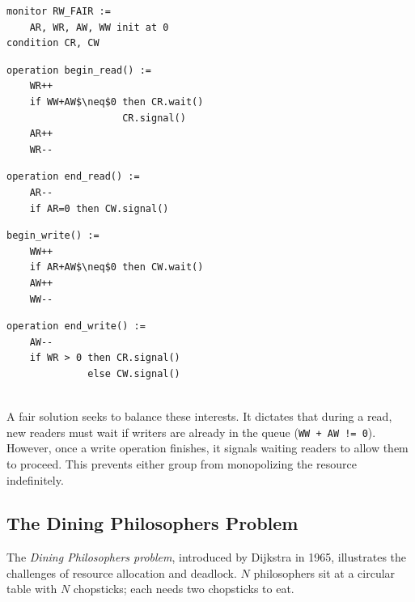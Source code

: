 \begin{minipage}{\textwidth}
\begin{lstlisting}[mathescape]
monitor RW_FAIR :=
    AR, WR, AW, WW init at 0
condition CR, CW
\end{lstlisting}
\begin{minipage}{0.45\textwidth}
\begin{lstlisting}[mathescape]
operation begin_read() :=
    WR++
    if WW+AW$\neq$0 then CR.wait()
                    CR.signal()
    AR++
    WR--
\end{lstlisting}
\end{minipage}
\hfill
\begin{minipage}{0.45\textwidth}
\begin{lstlisting}[mathescape]
operation end_read() :=
    AR--
    if AR=0 then CW.signal()
\end{lstlisting}
\end{minipage}
\begin{minipage}{0.45\textwidth}
\begin{lstlisting}[mathescape]
begin_write() :=
    WW++
    if AR+AW$\neq$0 then CW.wait()
    AW++
    WW--
\end{lstlisting}
\end{minipage}
\hfill
\begin{minipage}{0.45\textwidth}
\begin{lstlisting}[mathescape]
operation end_write() :=
    AW--
    if WR > 0 then CR.signal()
              else CW.signal()
\end{lstlisting}
\end{minipage}
\end{minipage}\\

A fair solution seeks to balance these interests. It dictates that during a read, new readers must wait if writers are already in the queue (\texttt{WW + AW != 0}). However, once a write operation finishes, it signals waiting readers to allow them to proceed. This prevents either group from monopolizing the resource indefinitely.


\subsection{The Dining Philosophers Problem}
The \textit{Dining Philosophers problem}, introduced by Dijkstra in 1965, illustrates the challenges of resource allocation and deadlock. $N$ philosophers sit at a circular table with $N$ chopsticks; each needs two chopsticks to eat.

